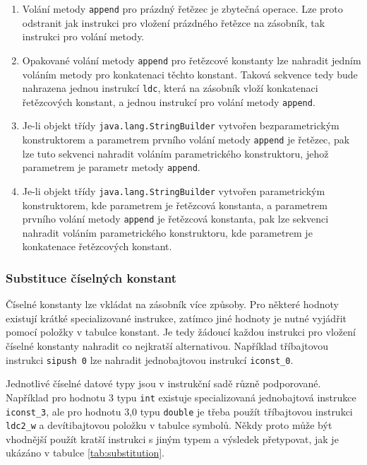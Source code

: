\begin{enumerate}
\item Volání metody \texttt{append} pro prázdný řetězec je zbytečná operace. Lze proto odstranit jak instrukci pro vložení prázdného řetězce na zásobník, tak instrukci pro volání metody. 

\item Opakované volání metody \texttt{append} pro řetězcové konstanty lze nahradit jedním voláním metody pro konkatenaci těchto konstant. Taková sekvence tedy bude nahrazena jednou instrukcí \texttt{ldc}, která na zásobník vloží konkatenaci řetězcových konstant, a jednou instrukcí pro volání metody \texttt{append}. 

\item Je-li objekt třídy \texttt{java.lang.StringBuilder} vytvořen bezparametrickým konstruktorem a parametrem prvního volání metody \texttt{append} je řetězec, pak lze tuto sekvenci nahradit voláním parametrického konstruktoru, jehož parametrem je parametr metody \texttt{append}.

\item Je-li objekt třídy \texttt{java.lang.StringBuilder} vytvořen parametrickým konstruktorem, kde parametrem je řetězcová konstanta, a parametrem prvního volání metody \texttt{append} je řetězcová konstanta, pak lze sekvenci nahradit voláním parametrického konstruktoru, kde parametrem je konkatenace řetězcových konstant.
\end{enumerate}

\subsubsection{Substituce číselných konstant}

Číselné konstanty lze vkládat na zásobník více způsoby. Pro některé hodnoty existují krátké specializované instrukce, zatímco jiné hodnoty je nutné vyjádřit pomocí položky v tabulce konstant. Je tedy žádoucí každou instrukci pro vložení číselné konstanty nahradit co nejkratší alternativou. Například tříbajtovou instrukci \texttt{sipush 0} lze nahradit jednobajtovou instrukcí \texttt{iconst\_0}.

Jednotlivé číselné datové typy jsou v instrukční sadě různě podporované. Například pro hodnotu 3 typu \texttt{int} existuje specializovaná jednobajtová instrukce \texttt{iconst\_3}, ale pro hodnotu 3,0 typu \texttt{double} je třeba použít tříbajtovou instrukci \texttt{ldc2\_w} a devítibajtovou položku v tabulce symbolů. Někdy proto může být vhodnější použít kratší instrukci s jiným typem a výsledek přetypovat, jak je ukázáno v tabulce \ref{tab:substitution}. 

